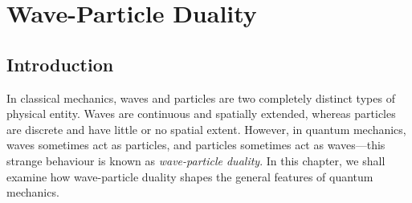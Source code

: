 \chapter{Wave-Particle Duality}\label{swave}
\section{Introduction}
In classical mechanics, waves and particles are two completely distinct
types of physical entity. Waves are continuous and spatially extended, where\-as particles are discrete and have little or no spatial
extent. However, in quantum mechanics, waves sometimes
act as particles, and particles sometimes act as waves---this strange behaviour
is known as {\em wave-particle duality}. In this chapter, we
shall examine how  wave-particle duality shapes the general features of quantum mechanics.

